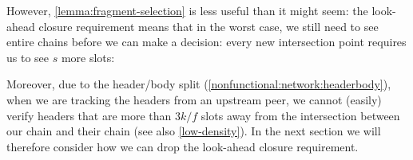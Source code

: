 However, \cref{lemma:fragment-selection} is less useful than it might seem:
the look-ahead closure requirement means that in the worst case, we still need
to see entire chains before we can make a decision: every new intersection point
requires us to see $s$ more slots:
%
\begin{center}
\end{center}
%
Moreover, due to the header/body split
(\cref{nonfunctional:network:headerbody}), when we are tracking the headers from
an upstream peer, we cannot (easily) verify headers that are more than $3k/f$
slots away from the intersection between our chain and their chain (see also
\cref{low-density}). In the next section we will therefore consider how we can
drop the look-ahead closure requirement.

